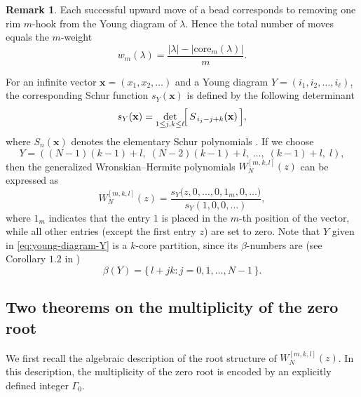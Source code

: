 \documentclass[preprint,3p,10pt]{elsarticle}
\theoremstyle{definition}
\newtheorem{remark}{Remark}[section]
\begin{document}
\begin{remark}
Each successful upward move of a bead corresponds to removing one rim $m$-hook from the Young diagram of $\lambda$.
Hence the total number of moves equals the $m$-weight
\begin{equation}
    w_m(\lambda)=\frac{|\lambda|-|\mathrm{core}_m(\lambda)|}{m}.
\end{equation}
\end{remark}

For an infinite vector $\mathbf{x}=(x_1,x_2,\ldots)$ and a Young diagram $Y=(i_1,i_2,\ldots,i_\ell)$, the
corresponding Schur function $s_Y(\mathbf{x})$ is defined by the following determinant \cite{macdonald1998symmetric}
\begin{equation}\label{eq:schur-jacobi-trudi}
s_Y(\mathbf{x})
=\det_{1\le j,k\le \ell}\!\Bigl[\,S_{\,i_j-j+k}(\mathbf{x})\,\Bigr],
\end{equation}
where $S_n(\mathbf{x})$ denotes the elementary Schur polynomials \cite{yang2023rogue}. If we choose
\begin{equation}\label{eq:young-diagram-Y}
Y=\left((N-1)(k-1)+l,\; (N-2)(k-1)+l,\; \ldots,\; (k-1)+l,\; l\right),
\end{equation}
then the generalized Wronskian--Hermite polynomials $W_N^{[m,k,l]}(z)$ can be expressed as \cite{clarkson2003second,yang2023rogue}
\begin{equation}\label{eq:WH-as-schur}
W_N^{[m,k,l]}(z)
=\frac{s_Y\!\bigl(z,0,\ldots,0,1_m,0,\ldots\bigr)}{s_Y(1,0,0,\ldots)},
\end{equation}
where $1_m$ indicates that the entry $1$ is placed in the $m$-th position of the vector, while all other entries
(except the first entry $z$) are set to zero.
Note that $Y$ given in \eqref{eq:young-diagram-Y} is a $k$-core partition, since its $\beta$-numbers are  (see Corollary $1.2$ in \cite{olsson2009core})
\begin{equation}
    \beta(Y)=\{\,l+jk: j=0,1,\dots,N-1\,\}.
\end{equation}

\subsection{Two theorems on the multiplicity of the zero root}
We first recall the algebraic description of the root structure of \(W_N^{[m,k,l]}(z)\). In this description, the multiplicity of the zero root
is encoded by an explicitly defined integer \(\Gamma_0\).
\end{document}
